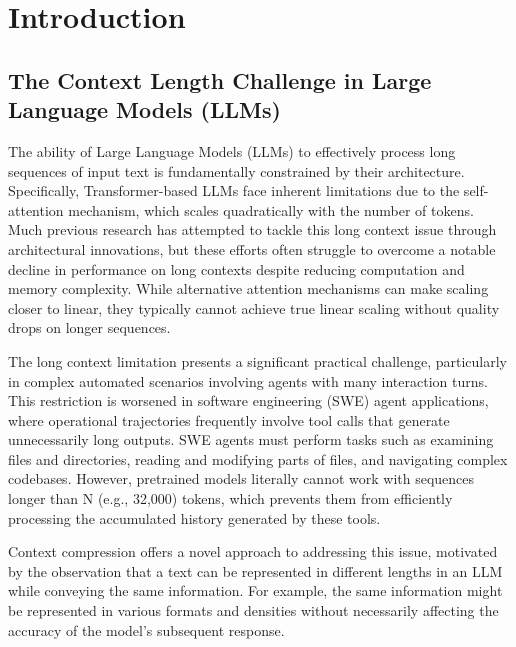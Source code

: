 \chapter{Introduction}


\section{The Context Length Challenge in Large Language Models (LLMs)}

The ability of Large Language Models (LLMs) to effectively process long sequences of input text is fundamentally constrained by their architecture.
Specifically, Transformer-based LLMs face inherent limitations due to the self-attention mechanism, which scales quadratically with the number of tokens.
Much previous research has attempted to tackle this long context issue through architectural innovations, but these efforts often struggle to overcome a notable decline in performance on long contexts despite reducing computation and memory complexity.
While alternative attention mechanisms can make scaling closer to linear, they typically cannot achieve true linear scaling without quality drops on longer sequences.

The long context limitation presents a significant practical challenge, particularly in complex automated scenarios involving agents with many interaction turns.
This restriction is worsened in software engineering (SWE) agent applications, where operational trajectories frequently involve tool calls that generate unnecessarily long outputs.
SWE agents must perform tasks such as examining files and directories, reading and modifying parts of files, and navigating complex codebases.
However, pretrained models literally cannot work with sequences longer than N (e.g., 32,000) tokens, which prevents them from efficiently processing the accumulated history generated by these tools.

Context compression offers a novel approach to addressing this issue, motivated by the observation that a text can be represented in different lengths in an LLM while conveying the same information.
For example, the same information might be represented in various formats and densities without necessarily affecting the accuracy of the model's subsequent response.

